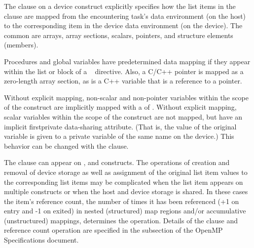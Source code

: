 The  clause on a device construct explicitly specifies how the list items in
the clause are mapped from the encountering task's data environment (on the host)
to the corresponding item in the device data environment (on the device).
The common  are arrays, array sections, scalars, pointers, and
structure elements (members). 

Procedures and global variables have predetermined data mapping if they appear
within the list or block of a ~ directive. Also, a C/C++ pointer
is mapped as a zero-length array section, as is a C++ variable that is a reference to a pointer.

Without explicit mapping, non-scalar and non-pointer variables within the scope of the 
construct are implicitly mapped with a  of .
Without explicit mapping, scalar variables within the scope of the 
construct are not mapped, but have an implicit firstprivate data-sharing
attribute. (That is, the value of the original variable is given to a private
variable of the same name on the device.) This behavior can be changed with
the  clause.

The  clause can appear on ,  and 
 constructs.  The operations of creation and
removal of device storage as well as assignment of the original list item 
values to the corresponding list items may be complicated when the list 
item appears on multiple constructs or when the host and device storage 
is shared. In these cases the item's reference count, the number of times
it has been referenced (+1 on entry and -1 on exited) in nested (structured)
map regions and/or accumulative (unstructured) mappings, determines the operation.
Details of the  clause and reference count operation are specified 
in the  subsection of the OpenMP Specifications document.


















